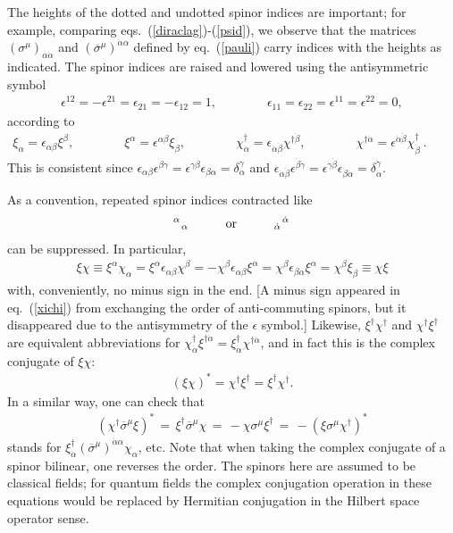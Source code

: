 \documentclass[11pt]{article}
\def\beq{\begin{eqnarray}}
\def\eeq{\end{eqnarray}}
\def\sigmabar{\overline\sigma}
\begin{document}
The heights of the dotted and undotted spinor indices are important; for
example, comparing eqs.~(\ref{diraclag})-(\ref{psid}), we observe that the
matrices $(\sigma^\mu)_{\alpha\dot{\alpha}}$ and
$(\sigmabar^\mu)^{\dot{\alpha}\alpha}$ defined by eq.~(\ref{pauli}) carry
indices with the heights as indicated. The spinor indices are raised and
lowered using the antisymmetric symbol 
\beq
\epsilon^{12} = -\epsilon^{21} =
\epsilon_{21} = -\epsilon_{12} = 1, \qquad\qquad \epsilon_{11} = \epsilon_{22} =
\epsilon^{11} = \epsilon^{22} = 0,
\label{eq:defepstwo}
\eeq 
according to
\beq
\xi_\alpha = \epsilon_{\alpha\beta}
\xi^\beta,\qquad\qquad\!\!\!\!\!\!\!\!\!
\xi^\alpha = \epsilon^{\alpha\beta}
\xi_\beta,\qquad\qquad\!\!\!\!\!\!\!\!\!
\chi^\dagger_{\dot{\alpha}} = \epsilon_{\dot{\alpha}\dot{\beta}}
\chi^{\dagger\dot{\beta}},\qquad\qquad\!\!\!\!\!\!\!\!\!
\chi^{\dagger\dot{\alpha}} = \epsilon^{\dot{\alpha}\dot{\beta}}
\chi^\dagger_{\dot{\beta}}\>.\qquad{}
\eeq
This is consistent since
$\epsilon_{\alpha\beta} \epsilon^{\beta\gamma} =
\epsilon^{\gamma\beta}\epsilon_{\beta\alpha} = \delta_\alpha^\gamma$
and
$\epsilon_{\dot{\alpha}\dot{\beta}} \epsilon^{\dot{\beta}\dot{\gamma}} =
\epsilon^{\dot{\gamma}\dot{\beta}}\epsilon_{\dot{\beta}\dot{\alpha}} =
\delta_{\dot{\alpha}}^{\dot{\gamma}}$.

\vspace{0.1cm}

As a convention, repeated spinor indices contracted like 
\beq
{}^\alpha\hspace{0.03cm}{}_\alpha \qquad\quad \mbox{or} 
\qquad\quad 
{}_{\dot{\alpha}}\hspace{0.03cm}{}^{\dot{\alpha}}\, 
\eeq 
can be suppressed.
In particular,
\beq
\xi\chi \equiv \xi^\alpha\chi_\alpha = \xi^\alpha \epsilon_{\alpha\beta}
\chi^\beta = -\chi^\beta \epsilon_{\alpha\beta} \xi^\alpha =
\chi^\beta \epsilon_{\beta\alpha} \xi^\alpha = \chi^\beta \xi_\beta \equiv
\chi\xi
\label{xichi}
\eeq
with, conveniently, no minus sign in the end. [A minus sign appeared in
eq.~(\ref{xichi}) from exchanging the order of anti-commuting spinors, but
it disappeared due to the antisymmetry of the $\epsilon$ symbol.]
Likewise, $\xi^\dagger \chi^\dagger$ and $\chi^\dagger \xi^\dagger $ are
equivalent abbreviations for $\chi^\dagger_{\dot{\alpha}} \xi^{\dagger
\dot{\alpha}} = \xi^\dagger_{\dot{\alpha}} \chi^{\dagger \dot{\alpha}}$,
and in fact this is the complex conjugate of $\xi\chi$: 
\beq
(\xi\chi)^* = \chi^\dagger \xi^\dagger = \xi^\dagger \chi^\dagger.
\eeq
In a similar way, one can check that
\beq
(\chi^\dagger \sigmabar^\mu \xi)^* \,=\, 
\xi^\dagger \sigmabar^\mu \chi \,=\, -\chi \sigma^\mu \xi^\dagger
\,=\,
 -(\xi\sigma^\mu\chi^\dagger)^*
\label{yetanotheridentity}
\eeq
stands for $\xi^\dagger_{\dot{\alpha}}(\sigmabar^\mu)^{\dot{\alpha}\alpha}
\chi_\alpha$, etc. Note that when taking the complex conjugate of a spinor bilinear,
one reverses the order. The spinors here are assumed to be
classical fields; for quantum fields the complex conjugation operation in these 
equations would be replaced by Hermitian conjugation in the Hilbert
space operator sense. 
\end{document}
